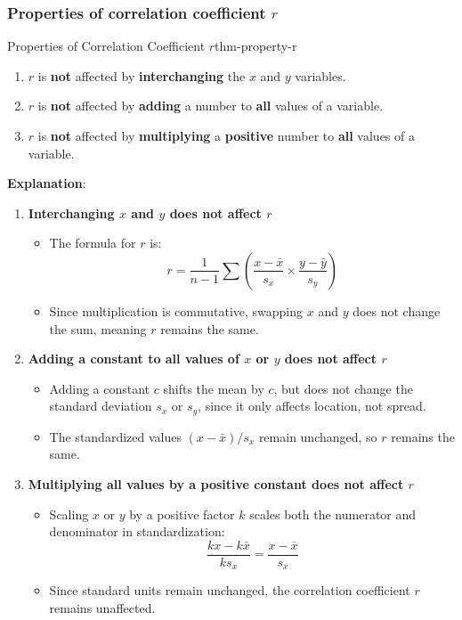 \documentclass[math,code]{amznotes}
\theoremstyle{remark}
\begin{document}
\subsubsection{Properties of correlation coefficient $r$}
\begin{thmbox}{Properties of Correlation Coefficient $r$}{thm-property-r}
    \begin{enumerate}
        \item $r$ is \textbf{not} affected by \textbf{interchanging} the $x$ and $y$ variables.
        \item $r$ is \textbf{not} affected by \textbf{adding} a number to \textbf{all} values of a variable.
        \item $r$ is \textbf{not} affected by \textbf{multiplying} a \textbf{positive} number to \textbf{all} values of a variable.
    \end{enumerate}
\end{thmbox}
\textbf{Explanation}:
\begin{enumerate}
    \item \textbf{Interchanging \( x \) and \( y \) does not affect \( r \)}  
    \begin{itemize}
        \item The formula for \( r \) is:
        \[
        r = \frac{1}{n-1} \sum \left( \frac{x - \bar{x}}{s_x} \times \frac{y - \bar{y}}{s_y} \right)
        \]
        \item Since multiplication is commutative, swapping \( x \) and \( y \) does not change the sum, meaning \( r \) remains the same.
    \end{itemize}
    
    \item \textbf{Adding a constant to all values of \( x \) or \( y \) does not affect \( r \)}  
    \begin{itemize}
        \item Adding a constant \( c \) shifts the mean by \( c \), but does not change the standard deviation \( s_x \) or \( s_y \), since it only affects location, not spread.
        \item The standardized values \( (x - \bar{x})/s_x \) remain unchanged, so \( r \) remains the same.
    \end{itemize}

    \item \textbf{Multiplying all values by a positive constant does not affect \( r \)}  
    \begin{itemize}
        \item Scaling \( x \) or \( y \) by a positive factor \( k \) scales both the numerator and denominator in standardization:
        \[
        \frac{kx - k\bar{x}}{ks_x} = \frac{x - \bar{x}}{s_x}
        \]
        \item Since standard units remain unchanged, the correlation coefficient \( r \) remains unaffected.
    \end{itemize}
\end{enumerate}
\end{document}
